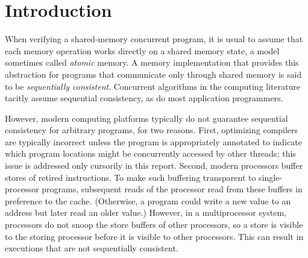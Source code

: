 \documentclass[11pt]{llncs}
\newcommand{\Def}[1]{\emph{#1}}
\begin{document}
\tableofcontents

\section{Introduction \label{sec:introduction}}

When verifying a shared-memory concurrent program, it is usual to
assume that each memory operation works directly on a shared memory
state, a model sometimes called \Def{atomic} memory. A memory
implementation that provides this abstraction for programs that
communicate only through shared memory is said to be \Def{sequentially
  consistent}. Concurrent algorithms in the computing literature
tacitly assume sequential consistency, as do most application
programmers.

However, modern computing platforms typically do not guarantee
sequential consistency for arbitrary programs, for two reasons. First,
optimizing compilers are typically incorrect unless the program is
appropriately annotated to indicate which program locations might be
concurrently accessed by other threads; this issue is addressed only
cursorily in this report. Second, modern processors buffer stores of
retired instructions. To make such buffering transparent to
single-processor programs, subsequent reads of the processor read from
these buffers in preference to the cache. (Otherwise, a program could
write a new value to an address but later read an older value.)
However, in a multiprocessor system, processors do not snoop the store
buffers of other processors, so a store is visible to the storing
processor before it is visible to other processors. This can result in
executions that are not sequentially consistent.
\end{document}
